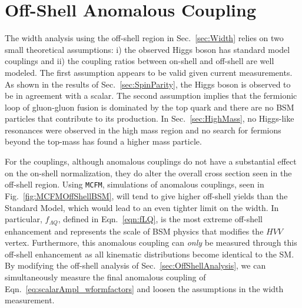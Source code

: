 \section{Off-Shell Anomalous Coupling}
\label{sec:OffShellAnom}

The width analysis using the off-shell region in Sec.~\ref{sec:Width} relies on two small theoretical assumptions: i) the observed Higgs boson has standard model couplings and ii) the coupling ratios between on-shell and off-shell are well modeled. The first assumption appears to be valid given current measurements. As shown in the results of Sec.~\ref{sec:SpinParity}, the Higgs boson is observed to be in agreement with a scalar. The second assumption implies that the fermionic loop of gluon-gluon fusion is dominated by the top quark and there are no BSM particles that contribute to its production. In Sec.~\ref{sec:HighMass}, no Higgs-like resonances were observed in the high mass region and no search \cite{Agashe:2014kda} for fermions beyond the top-mass has found a higher mass particle.

For the couplings, although anomalous couplings do not have a substantial effect on the on-shell normalization, they do alter the overall cross section seen in the off-shell region. Using {\tt MCFM}, simulations of anomalous couplings, seen in Fig.~\ref{fig:MCFMOffShellBSM}, will tend to give higher off-shell yields than the Standard Model, which would lead to an even tighter limit on the width. In particular, $f_{\Lambda Q}$, defined in Eqn.~\ref{eqn:fLQ}, is the most extreme off-shell enhancement and represents the scale of BSM physics that modifies the $HVV$ vertex. Furthermore, this anomalous coupling can \textit{only} be measured through this off-shell enhancement as all kinematic distributions become identical to the SM. By modifying the off-shell analysis of Sec.~\ref{sec:OffShellAnalysis}, we can simultaneously measure the final anomalous coupling of Eqn.~\ref{eq:scalarAmpl_wformfactors} and loosen the assumptions in the width measurement.

